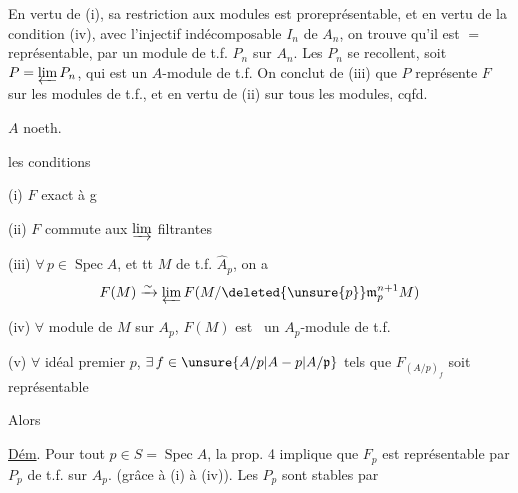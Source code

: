 En vertu de (i), sa restriction aux modules   est proreprésentable,   et en vertu de la condition (iv),  avec l'injectif indécomposable $I_n$ de $A_n$, on trouve qu'il est $=$ représentable,  par un module de t.f. $P_n$ sur $A_n$. Les $P_n$ se recollent, soit $P=\varprojlim P_n$, qui est un $A$-module de t.f. On conclut de (iii) que $P$ représente $F$ sur les modules de t.f., et en vertu de (ii) sur tous les modules, cqfd.

  \quad $A$ noeth. 

 

  les conditions

(i) $F$ exact  à g

(ii) $F$ commute aux $\varinjlim$ filtrantes

(iii) $\forall\,p\in\operatorname{Spec} A$, et tt $M$ de t.f. $\widehat A_p$, on a
\[
F(M)\xrightarrow{\sim}\varprojlim F(M/\deleted{\unsure{p}} \mathfrak m_p^{n+1}M)
\]

(iv) $\forall$ module de   $M$ sur $A_p$, $F(M)$ est \ un $A_p$-module de t.f.

(v) $\forall$ idéal premier $p$, \deleted{$\unsure{\forall}$} $\exists\, f\in\unsure{A/p|A-p|A/\mathfrak p}$ tels que $F_{(A/p)_f}$ soit représentable

Alors 

\uline{Dém}. Pour tout $p\in S=\operatorname{Spec} A$, la prop. 4 implique que $F_p$ est représentable par $P_p$ de t.f. sur $A_p$. (grâce à (i) à (iv)). Les $P_p$ sont stables par

